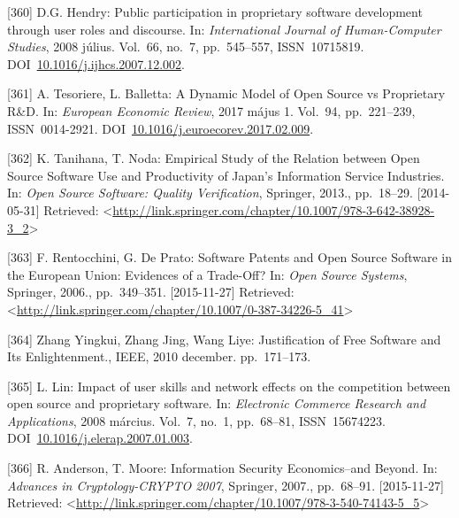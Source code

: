 \documentclass[12pt,magyar,a4paper,oneside]{scrreprt}
\newenvironment{cslreferences}%
  {}%
  {\par}
\begin{document}
\begin{cslreferences}
\leavevmode\hypertarget{ref-hendry_public_2008}{}%
{[}360{]} D.G. Hendry: Public participation in proprietary software
development through user roles and discourse. In: \emph{International
Journal of Human-Computer Studies}, 2008 július. Vol.~66, no.~7,
pp.~545--557, ISSN~10715819.
DOI~\href{https://doi.org/10.1016/j.ijhcs.2007.12.002}{10.1016/j.ijhcs.2007.12.002}.

\leavevmode\hypertarget{ref-tesoriere_dynamic_2017}{}%
{[}361{]} A. Tesoriere, L. Balletta: A Dynamic Model of Open Source vs
Proprietary R\&D. In: \emph{European Economic Review}, 2017 május 1.
Vol.~94, pp.~221--239, ISSN~0014-2921.
DOI~\href{https://doi.org/10.1016/j.euroecorev.2017.02.009}{10.1016/j.euroecorev.2017.02.009}.

\leavevmode\hypertarget{ref-tanihana_empirical_2013}{}%
{[}362{]} K. Tanihana, T. Noda: Empirical Study of the Relation between
Open Source Software Use and Productivity of Japan's Information Service
Industries. In: \emph{Open Source Software: Quality Verification},
Springer, 2013., pp.~18--29. {[}2014-05-31{]} Retrieved:
\textless{}\url{http://link.springer.com/chapter/10.1007/978-3-642-38928-3_2}\textgreater{}

\leavevmode\hypertarget{ref-rentocchini_software_2006}{}%
{[}363{]} F. Rentocchini, G. De Prato: Software Patents and Open Source
Software in the European Union: Evidences of a Trade-Off? In: \emph{Open
Source Systems}, Springer, 2006., pp.~349--351. {[}2015-11-27{]}
Retrieved:
\textless{}\url{http://link.springer.com/chapter/10.1007/0-387-34226-5_41}\textgreater{}

\leavevmode\hypertarget{ref-zhang_yingkui_justification_2010}{}%
{[}364{]} Zhang Yingkui, Zhang Jing, Wang Liye: Justification of Free
Software and Its Enlightenment., IEEE, 2010 december. pp.~171--173.

\leavevmode\hypertarget{ref-lin_impact_2008}{}%
{[}365{]} L. Lin: Impact of user skills and network effects on the
competition between open source and proprietary software. In:
\emph{Electronic Commerce Research and Applications}, 2008 március.
Vol.~7, no.~1, pp.~68--81, ISSN~15674223.
DOI~\href{https://doi.org/10.1016/j.elerap.2007.01.003}{10.1016/j.elerap.2007.01.003}.

\leavevmode\hypertarget{ref-anderson_information_2007}{}%
{[}366{]} R. Anderson, T. Moore: Information Security Economics--and
Beyond. In: \emph{Advances in Cryptology-CRYPTO 2007}, Springer, 2007.,
pp.~68--91. {[}2015-11-27{]} Retrieved:
\textless{}\url{http://link.springer.com/chapter/10.1007/978-3-540-74143-5_5}\textgreater{}


\end{cslreferences}
\end{document}

